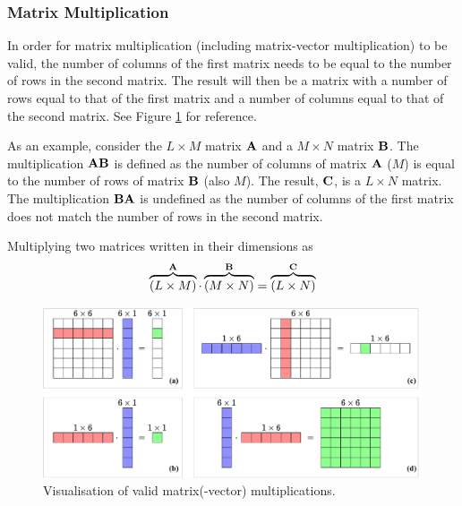 \subsubsection{Matrix Multiplication}
In order for matrix multiplication (including matrix-vector multiplication) to be valid, the number of columns of the first matrix needs to be equal to the number of rows in the second matrix. The result will then be a matrix with a number of rows equal to that of the first matrix and a number of columns equal to that of the second matrix. See Figure \ref{fig:matrixVector} for reference.

As an example, consider the $L
\times M$ matrix $
\mathbf{A}$ and a $M\times N$ matrix $
\mathbf{B}$. The multiplication $\mathbf{A}\mathbf{B}$ is defined as the number of columns of matrix $
\mathbf{A}$ ($M$) is equal to the number of rows of matrix $\mathbf{B}$ (also $M$). The result, $\mathbf{C}$, is a $L \times N$ matrix. The multiplication $\mathbf{B}\mathbf{A}$ is undefined as the number of columns of the first matrix does not match the number of rows in the second matrix. 

Multiplying two matrices written in their dimensions as 
\begin{equation}
    \overbrace{(L\times M)}^{\mathbf{A}}\cdot \overbrace{(M\times N)}^{\mathbf{B}} = \overbrace{(L
    \times N)}^{\mathbf{C}}
\end{equation}
 
\begin{figure}[h]
    \includegraphics[width=\textwidth]{figures/fdtd/matrixVector2.pdf}
    \caption{Visualisation of valid matrix(-vector) multiplications. \label{fig:matrixVector}}
\end{figure}

